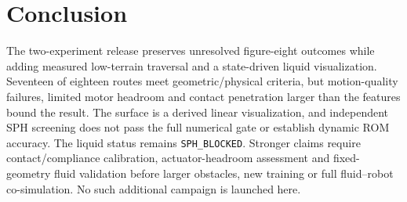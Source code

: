 \section{Conclusion}
The two-experiment release preserves unresolved figure-eight outcomes while adding measured low-terrain traversal and a state-driven liquid visualization. Seventeen of eighteen routes meet geometric/physical criteria, but motion-quality failures, limited motor headroom and contact penetration larger than the features bound the result. The surface is a derived linear visualization, and independent SPH screening does not pass the full numerical gate or establish dynamic ROM accuracy. The liquid status remains \texttt{SPH\_BLOCKED}. Stronger claims require contact/compliance calibration, actuator-headroom assessment and fixed-geometry fluid validation before larger obstacles, new training or full fluid--robot co-simulation. No such additional campaign is launched here.
